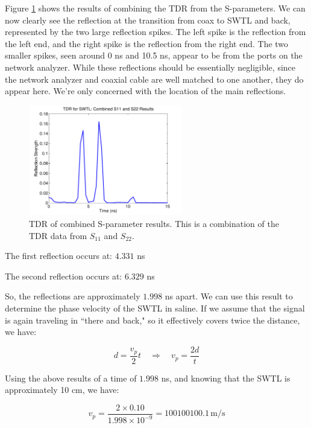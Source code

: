 \documentclass[12pt,onecolumn,titlepage]{article}
\begin{document}
Figure \ref{fig:SWTL_TDR_AWG36_combined_sparam} shows the results of combining the TDR from the S-parameters. We can now clearly see the reflection at the transition from coax to SWTL and back, represented by the two large reflection spikes. The left spike is the reflection from the left end, and the right spike is the reflection from the right end. The two smaller spikes, seen around 0 ns and 10.5 ns, appear to be from the ports on the network analyzer. While these reflections should be essentially negligible, since the network analyzer and coaxial cable are well matched to one another, they do appear here. We're only concerned with the location of the main reflections. 



\begin{figure}[htbp]
	\centering
	\includegraphics[width=0.6\textwidth]{Pictures/22July2013/SWTL_TDR_AWG36_combined_sparam}
	\caption{ TDR of combined S-parameter results. This is a combination of the TDR data from $S_{11}$ and $S_{22}$. } 
	\label{fig:SWTL_TDR_AWG36_combined_sparam}
\end{figure}



The first reflection occurs at: $4.331$ ns 

The second reflection occurs at: $6.329$ ns 

So, the reflections are approximately $1.998$ ns apart. We can use this result to determine the phase velocity of the SWTL in saline. If we assume that the signal is again traveling in ``there and back," so it effectively covers twice the distance, we have:

\[ d = \frac{v_p}{2} t \quad \Rightarrow \quad v_p = \frac{2d}{t} \]

Using the above results of a time of $1.998$ ns, and knowing that the SWTL is approximately 10 cm, we have:

\[ v_p = \frac{2 \times 0.10}{1.998 \times 10^{-9}} = 100100100.1 \, \text{m/s} \]
\end{document}
